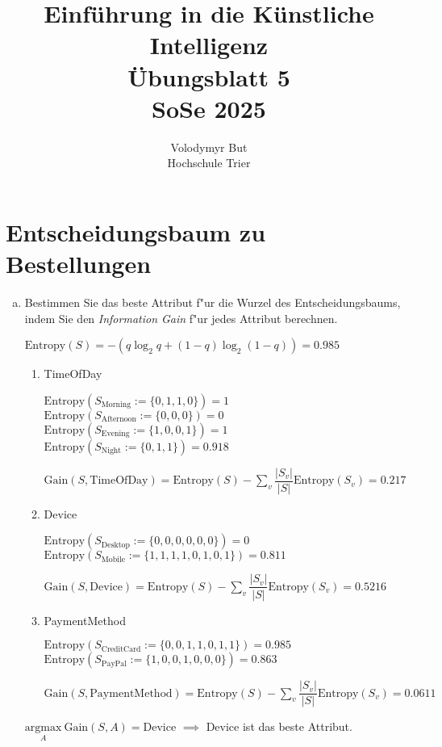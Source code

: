 \documentclass[10pt, oneside]{article}
\title{Einführung in die Künstliche Intelligenz\\[15pt]\Large{Übungsblatt 5}\\[10pt]\Large{SoSe 2025}}
\author{Volodymyr But\\[10pt]Hochschule Trier}
\date{}
\begin{document}
\maketitle
\vspace{25px}

\section{Entscheidungsbaum zu Bestellungen}

\begin{enumerate}[(a)]
    \item Bestimmen Sie das beste Attribut f"ur die Wurzel des Entscheidungsbaums, indem
        Sie den \textit{Information Gain} f"ur jedes Attribut berechnen.

        $\text{Entropy}(S) = -(q\log_2q + (1 - q)\log_2(1 - q)) = 0.985$

        \begin{enumerate}[1.]
            \item TimeOfDay

                $\text{Entropy}(S_{\text{Morning}} := \{0, 1, 1, 0\}) = 1$ \\[5pt]
                $\text{Entropy}(S_{\text{Afternoon}} := \{0, 0, 0\}) = 0$ \\[5pt]
                $\text{Entropy}(S_{\text{Evening}} := \{1, 0, 0, 1\}) = 1$ \\[5pt]
                $\text{Entropy}(S_{\text{Night}} := \{0, 1, 1\}) = 0.918$

                $\text{Gain}(S, \text{TimeOfDay}) = \text{Entropy}(S) - \sum_v\dfrac{|S_v|}{|S|}\text{Entropy}(S_v) = 0.217$

            \item Device

                $\text{Entropy}(S_{\text{Desktop}} := \{0, 0, 0, 0, 0, 0\}) = 0$ \\[5pt]
                $\text{Entropy}(S_{\text{Mobile}}  := \{1, 1, 1, 1, 0, 1, 0, 1\}) = 0.811$

                $\text{Gain}(S, \text{Device}) = \text{Entropy}(S) - \sum_v\dfrac{|S_v|}{|S|}\text{Entropy}(S_v) = 0.5216$

            \item PaymentMethod

                $\text{Entropy}(S_{\text{CreditCard}} := \{0, 0, 1, 1, 0, 1, 1\}) = 0.985$ \\[5pt]
                $\text{Entropy}(S_{\text{PayPal}} := \{1, 0, 0, 1, 0, 0, 0\}) = 0.863$

                $\text{Gain}(S, \text{PaymentMethod}) = \text{Entropy}(S) - \sum_v\dfrac{|S_v|}{|S|}\text{Entropy}(S_v) = 0.0611$
        \end{enumerate}

        $\underset{A}{\text{argmax}}\ \text{Gain}(S, A) = \text{Device}$ $\implies$ Device ist das beste Attribut.
\end{enumerate}
\end{document}
